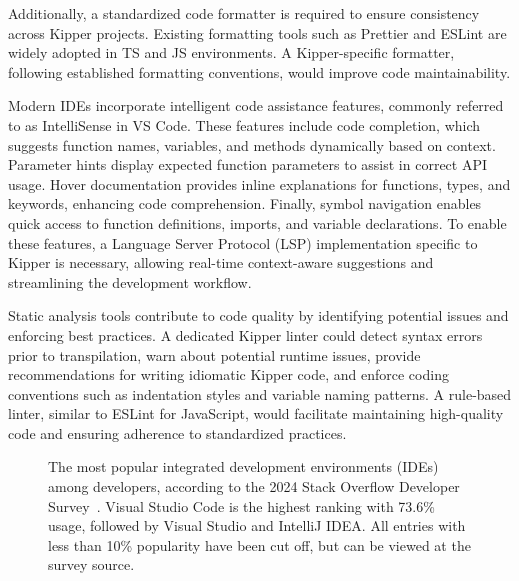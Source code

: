 Additionally, a standardized code formatter is required to ensure consistency across Kipper projects. Existing formatting tools such as Prettier and ESLint are widely adopted in TS and JS environments. A Kipper-specific formatter, following established formatting conventions, would improve code maintainability.

Modern IDEs incorporate intelligent code assistance features, commonly referred to as IntelliSense in VS Code. These features include code completion, which suggests function names, variables, and methods dynamically based on context. Parameter hints display expected function parameters to assist in correct API usage. Hover documentation provides inline explanations for functions, types, and keywords, enhancing code comprehension. Finally, symbol navigation enables quick access to function definitions, imports, and variable declarations. To enable these features, a Language Server Protocol (LSP) implementation specific to Kipper is necessary, allowing real-time context-aware suggestions and streamlining the development workflow.

Static analysis tools contribute to code quality by identifying potential issues and enforcing best practices. A dedicated Kipper linter could detect syntax errors prior to \gls{transpilation}, warn about potential runtime issues, provide recommendations for writing idiomatic Kipper code, and enforce coding conventions such as indentation styles and variable naming patterns. A rule-based linter, similar to ESLint for JavaScript, would facilitate maintaining high-quality code and ensuring adherence to standardized practices.

\begin{figure}[htbp]
	\centering
	\def\stackalignment{r}
	\caption{The most popular integrated development environments (IDEs) among developers, according to the 2024 Stack Overflow Developer Survey~\cite{stackoverflow2024}. Visual Studio Code is the highest ranking with 73.6\% usage, followed by Visual Studio and IntelliJ IDEA. All entries with less than 10\% popularity have been cut off, but can be viewed at the survey source.}
	\label{fig:stackoverflow-survey-result}
\end{figure}

